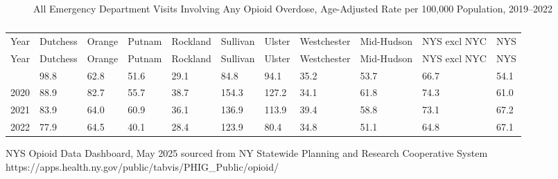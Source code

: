 \documentclass[
  english,
  letterpaper,
]{report}
\begin{document}
\begin{figure}


\caption{\label{fig-ed-visit-opioid-aar}All Emergency Department Visits
Involving Any Opioid Overdose, Age-Adjusted Rate per 100,000 Population,
2019--2022}

\end{figure}%

\begin{longtable}[]{@{}lllllllllll@{}}

\caption{\label{tbl-ed-visit-opioid-aar}All Emergency Department Visits
Involving Any Opioid Overdose, Age-Adjusted Rate per 100,000 Population,
2019--2022}

\tabularnewline

\caption{}\label{T_6c542}\tabularnewline
\toprule\noalign{}
Year & Dutchess & Orange & Putnam & Rockland & Sullivan & Ulster &
Westchester & Mid-Hudson & NYS excl NYC & NYS \\
\midrule\noalign{}
\endfirsthead
\toprule\noalign{}
Year & Dutchess & Orange & Putnam & Rockland & Sullivan & Ulster &
Westchester & Mid-Hudson & NYS excl NYC & NYS \\
\midrule\noalign{}
\endhead
\bottomrule\noalign{}
\endlastfoot
2019 & 98.8 & 62.8 & 51.6 & 29.1 & 84.8 & 94.1 & 35.2 & 53.7 & 66.7 &
54.1 \\
2020 & 88.9 & 82.7 & 55.7 & 38.7 & 154.3 & 127.2 & 34.1 & 61.8 & 74.3 &
61.0 \\
2021 & 83.9 & 64.0 & 60.9 & 36.1 & 136.9 & 113.9 & 39.4 & 58.8 & 73.1 &
67.2 \\
2022 & 77.9 & 64.5 & 40.1 & 28.4 & 123.9 & 80.4 & 34.8 & 51.1 & 64.8 &
67.1 \\

\end{longtable}

\begin{tcolorbox}[enhanced jigsaw, breakable, leftrule=.75mm, title=\textcolor{quarto-callout-note-color}{\faInfo}\hspace{0.5em}{Source}, bottomrule=.15mm, opacityback=0, left=2mm, colback=white, bottomtitle=1mm, coltitle=black, colbacktitle=quarto-callout-note-color!10!white, colframe=quarto-callout-note-color-frame, opacitybacktitle=0.6, toptitle=1mm, titlerule=0mm, arc=.35mm, rightrule=.15mm, toprule=.15mm]

NYS Opioid Data Dashboard, May 2025 sourced from NY Statewide Planning
and Research Cooperative System
https://apps.health.ny.gov/public/tabvis/PHIG\_Public/opioid/

\end{tcolorbox}
\end{document}
